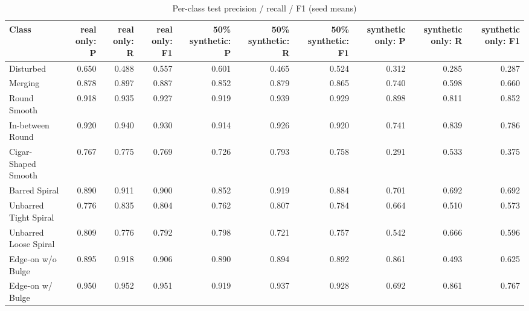 \begin{table}[t]
\centering
\footnotesize
\caption{Per-class test precision / recall / F1 (seed means)}
\label{tab:t10_per_class_test}
\begin{tabular}{lrrrrrrrrr}
\toprule
Class & real only: P & real only: R & real only: F1 & 50\% synthetic: P & 50\% synthetic: R & 50\% synthetic: F1 & synthetic only: P & synthetic only: R & synthetic only: F1 \\
\midrule
Disturbed & 0.650 & 0.488 & 0.557 & 0.601 & 0.465 & 0.524 & 0.312 & 0.285 & 0.287 \\
Merging & 0.878 & 0.897 & 0.887 & 0.852 & 0.879 & 0.865 & 0.740 & 0.598 & 0.660 \\
Round Smooth & 0.918 & 0.935 & 0.927 & 0.919 & 0.939 & 0.929 & 0.898 & 0.811 & 0.852 \\
In-between Round & 0.920 & 0.940 & 0.930 & 0.914 & 0.926 & 0.920 & 0.741 & 0.839 & 0.786 \\
Cigar-Shaped Smooth & 0.767 & 0.775 & 0.769 & 0.726 & 0.793 & 0.758 & 0.291 & 0.533 & 0.375 \\
Barred Spiral & 0.890 & 0.911 & 0.900 & 0.852 & 0.919 & 0.884 & 0.701 & 0.692 & 0.692 \\
Unbarred Tight Spiral & 0.776 & 0.835 & 0.804 & 0.762 & 0.807 & 0.784 & 0.664 & 0.510 & 0.573 \\
Unbarred Loose Spiral & 0.809 & 0.776 & 0.792 & 0.798 & 0.721 & 0.757 & 0.542 & 0.666 & 0.596 \\
Edge-on w/o Bulge & 0.895 & 0.918 & 0.906 & 0.890 & 0.894 & 0.892 & 0.861 & 0.493 & 0.625 \\
Edge-on w/ Bulge & 0.950 & 0.952 & 0.951 & 0.919 & 0.937 & 0.928 & 0.692 & 0.861 & 0.767 \\
\bottomrule
\end{tabular}
\end{table}
